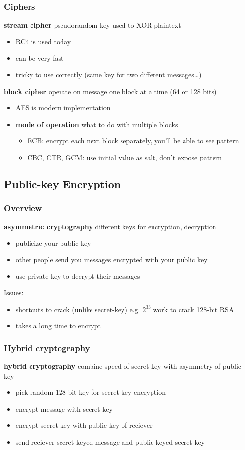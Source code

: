 \documentclass[]{article}
\theoremstyle{definition}
\begin{document}
	\subsubsection{Ciphers}
	\textbf{stream cipher} pseudorandom key used to XOR plaintext
	\begin{itemize}
		\item RC4 is used today
		\item can be very fast
		\item tricky to use correctly (same key for two different messages\dots)
	\end{itemize}
	\textbf{block cipher} operate on message one block at a time (64 or 128 bits)
	\begin{itemize}
		\item AES is modern implementation
		\item \textbf{mode of operation} what to do with multiple blocks
		\begin{itemize}
			\item ECB: encrypt each next block separately, you'll be able to see pattern
			\item CBC, CTR, GCM: use initial value as salt, don't expose pattern
		\end{itemize}
	\end{itemize}

	\subsection{Public-key Encryption}
	\subsubsection{Overview}
	\textbf{asymmetric cryptography} different keys for encryption, decryption
	\begin{itemize}
		\item publicize your public key
		\item other people send you messages encrypted with your public key
		\item use private key to decrypt their messages
	\end{itemize}
	Issues:
	\begin{itemize}
		\item shortcuts to crack (unlike secret-key) e.g. $2^{33}$ work to crack 128-bit RSA
		\item takes a long time to encrypt
	\end{itemize}

	\subsubsection{Hybrid cryptography}
	\textbf{hybrid cryptography} combine speed of secret key with asymmetry of public key
	\begin{itemize}
		\item pick random 128-bit key for secret-key encryption
		\item encrypt message with secret key
		\item encrypt secret key with public key of reciever
		\item send reciever secret-keyed message and public-keyed secret key
	\end{itemize}
\end{document}
